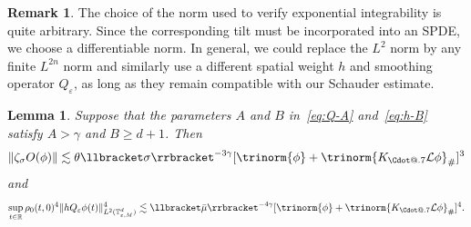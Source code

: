 \documentclass{article}
\makeatletter
\numberwithin{equation}{section}
\newcommand*\Cdot{{\mathpalette\Cdot@{.7}}}
\newcommand*\Cdot@[2]{\mathbin{\vcenter{\hbox{\scalebox{#2}{\hspace{0.1mm}$\m@th#1\bullet$\hspace{0.1mm}}}}}}
\theoremstyle{plain}
\newtheorem{lemma}[theorem]{Lemma}
\theoremstyle{definition}
\newtheorem{remark}[theorem]{Remark}
\makeatother
\begin{document}
\begin{remark}
  The choice of the norm used to verify exponential integrability is quite
  arbitrary. Since the corresponding tilt must be incorporated into an SPDE, we
  choose a differentiable norm. In general, we could replace the $L^2$ norm by any
  finite $L^{2 n}$ norm and similarly use a different
  spatial weight $h$ and smoothing operator $Q_{\varepsilon}$, as long as
  they remain compatible with our Schauder estimate.
\end{remark}

\begin{lemma}
  \label{lem:bound-o}Suppose that the parameters $A$ and $B$ in~\eqref{eq:Q-A}
  and~\eqref{eq:h-B} satisfy $A > \gamma$ and $B \geqslant d + 1$. Then
  \[ \| \zeta_{\sigma} O (\phi) \| \lesssim \theta \llbracket \sigma
     \rrbracket^{- 3 \gamma} [\trinorm{ \phi } + \trinorm{
     K_{\Cdot} \mathcal{L} \phi }_{\#}]^3 \]
  and
  \[ \sup_{t \in \mathbb{R}} \rho_0 (t, 0)^4  \| hQ_{\varepsilon} \phi (t)
     \|_{L^2 (\mathbb{T}^d_{\varepsilon, M})}^4 \lesssim \llbracket \bar{\mu}
     \rrbracket^{- 4 \gamma} [\trinorm{ \phi } + \trinorm{
     K_{\Cdot} \mathcal{L} \phi }_{\#}]^4 . \]
\end{lemma}
\end{document}
